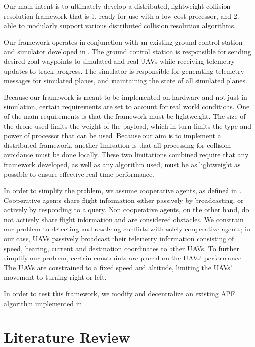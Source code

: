 \documentclass[conference]{IEEEtran}
\begin{document}
Our main intent is to ultimately develop a distributed, lightweight collision resolution framework  that is 1. ready for use with a low cost processor, and 2. able to modularly support various distributed collision resolution algorithms. 

Our framework operates in conjunction with an existing ground control station and simulator developed in \cite{holt2012comparison}. The ground control station is responsible for sending desired goal waypoints to simulated and real UAVs while receiving telemetry updates to track progress. The simulator is responsible for generating telemetry messages for simulated planes, and maintaining the state of all simulated planes. 

Because our framework is meant to be implemented on hardware and not just in simulation, certain requirements are set to account for real world conditions. One of the main requirements is that the framework must be lightweight. The size of the drone used limits the weight of the payload, which in turn limits the type and power of processor that can be used. Because our aim is to implement a distributed framework, another limitation is that all processing for collision avoidance must be done locally. These two limitations combined require that any framework developed, as well as any algorithm used, must be as lightweight as possible to ensure effective real time performance.

In order to simplify the problem, we assume cooperative agents, as defined in \cite{roadmap2002roadmap}. Cooperative agents share flight information either passively by broadcasting, or actively by responding to a query. Non cooperative agents, on the other hand, do not actively share flight information and are considered obstacles. We constrain our problem to detecting and resolving conflicts with solely cooperative agents; in our case, UAVs passively broadcast their telemetry information consisting of speed, bearing, current and destination coordinates to other UAVs. To further simplify our problem, certain constraints are placed on the UAVs' performance.  The UAVs are constrained to a fixed speed and altitude, limiting the UAVs' movement to turning right or left. 

In order to test this framework, we modify and decentralize an existing APF algorithm implemented in \cite{siudynamic}.


\section{Literature Review}
\label{sec:litReview}
\end{document}

